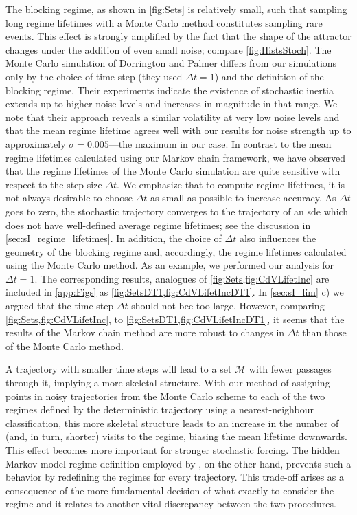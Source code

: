 The blocking regime, as shown in \cref{fig:Sets} is relatively small, such that sampling long regime lifetimes with a Monte Carlo method constitutes sampling rare events. This effect is strongly amplified by the fact that the shape of the attractor changes under the addition of even small noise; compare \cref{fig:HistsStoch}. The Monte Carlo simulation of Dorrington and Palmer \parencite[fig.~6]{dorringtonInteractionStochasticForcing2023} differs from our simulations only by the choice of time step (they used $\Delta t=1$) and the definition of the blocking regime. Their experiments indicate the existence of stochastic inertia extends up to higher noise levels and increases in magnitude in that range. We note that their approach reveals a similar volatility at very low noise levels and that the mean regime lifetime agrees well with our results for noise strength up to approximately $\sigma = 0.005$---the maximum in our case. In contrast to the mean regime lifetimes calculated using our Markov chain framework, we have observed that the regime lifetimes of the Monte Carlo simulation are quite sensitive with respect to the step size $\Delta t$. We emphasize that to compute regime lifetimes, it is not always desirable to choose $\Delta t$ as small as possible to increase accuracy. As $\Delta t$ goes to zero, the stochastic trajectory converges to the trajectory of an \gls{sde} which does not have well-defined average regime lifetimes; see the discussion in \cref{sec:sI_regime_lifetimes}. In addition, the choice of $\Delta t$ also influences the geometry of the blocking regime and, accordingly, the regime lifetimes calculated using the Monte Carlo method. As an example, we performed our analysis for $\Delta t = 1$. The corresponding results, analogues of \cref{fig:Sets,fig:CdVLifetInc} are included in \cref{app:Figs} as \cref{fig:SetsDT1,fig:CdVLifetIncDT1}. In \cref{sec:sI_lim} c) we argued that the time step $\Delta t$ should not bee too large. However, comparing \cref{fig:Sets,fig:CdVLifetInc}, to \cref{fig:SetsDT1,fig:CdVLifetIncDT1}, it seems that the results of the Markov chain method are more robust to changes in $\Delta t$ than those of the Monte Carlo method.

A trajectory with smaller time steps will lead to a set $\mathcal{M}$ with fewer passages through it, implying a more skeletal structure. With our method of assigning points in noisy trajectories from the Monte Carlo scheme to each of the two regimes defined by the deterministic trajectory using a nearest-neighbour classification, this more skeletal structure leads to an increase in the number of (and, in turn, shorter) visits to the regime, biasing the mean lifetime downwards. This effect becomes more important for stronger stochastic forcing. The hidden Markov model regime definition employed by \textcite{dorringtonInteractionStochasticForcing2023}, on the other hand, prevents such a behavior by redefining the regimes for every trajectory. This trade-off arises as a consequence of the more fundamental decision of what exactly to consider the regime and it  relates to another vital discrepancy between the two procedures.

